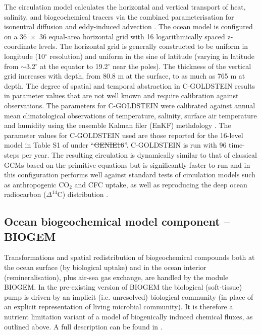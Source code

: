 \documentclass[gmd, manuscript]{copernicus}
\providecommand{\DIFadd}[1]{{\protect\color{blue}\uwave{#1}}} %
\providecommand{\DIFdel}[1]{{\protect\color{red}\sout{#1}}}                      %
\providecommand{\DIFaddbegin}{} %
\providecommand{\DIFaddend}{} %
\providecommand{\DIFdelbegin}{} %
\providecommand{\DIFdelend}{} %
\begin{document}
The circulation model calculates the horizontal and vertical transport of heat, salinity, and biogeochemical tracers via the combined parameterisation for isoneutral diffusion and eddy-induced advection \citep{EdwardsMarsh:2005,Marsh:2011}. The ocean model is configured on a 36~$\times$~36 equal-area horizontal grid with 16 logarithmically spaced z-coordinate levels. The horizontal grid is generally constructed to be uniform in longitude (10$^\circ$ resolution) and uniform in the sine of latitude (varying in latitude from $\sim$3.2$^\circ$ at the equator to 19.2$^\circ$ near the poles). The thickness of the vertical grid increases with depth, from 80.8 m at the surface, to as much as 765 m at depth. The degree of spatial and temporal abstraction in C-GOLDSTEIN results in parameter values that are not well known and require calibration against observations. The parameters for C-GOLDSTEIN were calibrated against annual mean climatological observations of temperature, salinity, surface air temperature and humidity using the ensemble Kalman filer (EnKF) methdology \citep{Hargreaves:2004,Ridgwell:2007}. The parameter values for C-GOLDSTEIN used are those reported for the 16-level model in Table S1 of \citet{Cao:2009} under ``\DIFdelbegin \DIFdel{GENIE16}\DIFdelend \DIFaddbegin \DIFadd{GEnIE16}\DIFaddend ''. C-GOLDSTEIN is run with 96 time-steps per year.  The resulting circulation is dynamically similar to that of classical GCMs based on the primitive equations but is significantly faster to run and in this configuration performs well against standard tests of circulation models such as anthropogenic CO$_2$ and CFC uptake, as well as reproducing the deep ocean radiocarbon ($\Delta^{14}$C) distribution \citep{Cao:2009}.


%
\subsection{Ocean biogeochemical model component -- BIOGEM}\label{BIOGEM}

Transformations and spatial redistribution of biogeochemical compounds both at the ocean surface (by biological uptake) and in the ocean interior (remineralisation), plus  air-sea gas exchange, are handled by the module BIOGEM. In the pre-existing version of BIOGEM the biological (soft-tissue) pump is driven by an implicit (i.e. unresolved) biological community (in place of an explicit representation of living microbial community). It is therefore a nutrient limitation variant of a model of biogenically induced chemical fluxes, as outlined above. A full description can be found in \citep{Ridgwell:2007, Ridgwell:prep}.  
\end{document}
